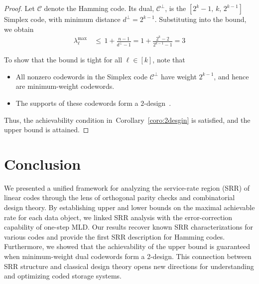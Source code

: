 \documentclass[conference,letterpaper]{IEEEtran}
\newtheorem{remark}{Remark}
\begin{document}
\begin{proof}
Let \( \mathcal{C} \) denote the Hamming code. Its dual, \( \mathcal{C}^\perp \), is the \( [2^k - 1,\, k,\, 2^{k-1}] \) Simplex code, with minimum distance \( d^\perp = 2^{k-1} \). Substituting into the bound, we obtain
\begin{align*}
\lambda_{\ell}^{\max} &\,\le\, 1 + \frac{n - 1}{d^\perp - 1} = 1 + \frac{2^k - 2}{2^{k-1} - 1} = 3
\end{align*}

To show that the bound is tight for all \( \ell \in [k] \), note that
\begin{itemize}
    \item All nonzero codewords in the Simplex code \( \mathcal{C}^\perp \) have weight \( 2^{k-1} \), and hence are minimum-weight codewords.
    \item The supports of these codewords form a \( 2 \)-design~\cite{t_design:journals/ccds/DingT21}.
\end{itemize}

Thus, the achievability condition in~Corollary~\ref{coro:2desgin} is satisfied, and the upper bound is attained.
\end{proof}

\section{Conclusion}
We presented a unified framework for analyzing the service-rate region (SRR) of linear codes through the lens of orthogonal parity checks and combinatorial design theory. By establishing upper and lower bounds on the maximal achievable rate for each data object, we linked SRR analysis with the error-correction capability of one-step MLD. Our results recover known SRR characterizations for various codes and provide the first SRR description for Hamming codes. Furthermore, we showed that the achievability of the upper bound is guaranteed when minimum-weight dual codewords form a 2-design. This connection between SRR structure and classical design theory opens new directions for understanding and optimizing coded storage systems.
\end{document}
